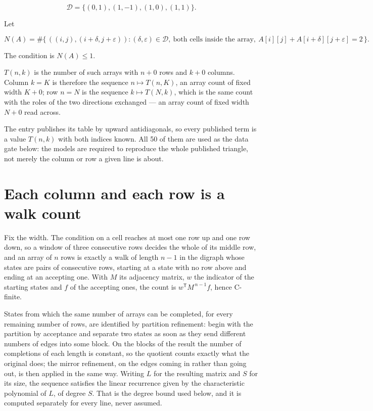 \documentclass[11pt]{article}
\theoremstyle{definition}
\begin{document}
\[\mathcal{D} = \{(0,1), (1,-1), (1,0), (1,1)\}.\]

Let

\[N(A) = \#\bigl\{\,((i,j),(i{+}\delta,j{+}\varepsilon)) : (\delta,\varepsilon) \in \mathcal{D},\ \text{both cells inside the array},\ A[i][j] + A[i{+}\delta][j{+}\varepsilon] = 2\,\bigr\}.\]

The condition is $N(A) \le 1$.

$T(n,k)$ is the number of such arrays with $n + 0$ rows and $k + 0$ columns. Column $k = K$ is therefore the sequence $n \mapsto T(n,K)$, an array count of fixed width $K + 0$; row $n = N$ is the sequence $k \mapsto T(N,k)$, which is the same count with the roles of the two directions exchanged --- an array count of fixed width $N + 0$ read across.

The entry publishes its table by upward antidiagonals, so every published term is a value $T(n,k)$ with both indices known. All 50 of them are used as the data gate below: the models are required to reproduce the whole published triangle, not merely the column or row a given line is about.

\section{Each column and each row is a walk count}

Fix the width. The condition on a cell reaches at most one row up and one row down, so a window of three consecutive rows decides the whole of its middle row, and an array of $n$ rows is exactly a walk of length $n-1$ in the digraph whose states are pairs of consecutive rows, starting at a state with no row above and ending at an accepting one. With $M$ its adjacency matrix, $w$ the indicator of the starting states and $f$ of the accepting ones, the count is $w^{\mathsf T}M^{\,n-1}f$, hence C-finite.

States from which the same number of arrays can be completed, for every remaining number of rows, are identified by partition refinement: begin with the partition by acceptance and separate two states as soon as they send different numbers of edges into some block. On the blocks of the result the number of completions of each length is constant, so the quotient counts exactly what the original does; the mirror refinement, on the edges coming in rather than going out, is then applied in the same way. Writing $L$ for the resulting matrix and $S$ for its size, the sequence satisfies the linear recurrence given by the characteristic polynomial of $L$, of degree $S$. That is the degree bound used below, and it is computed separately for every line, never assumed.
\end{document}
